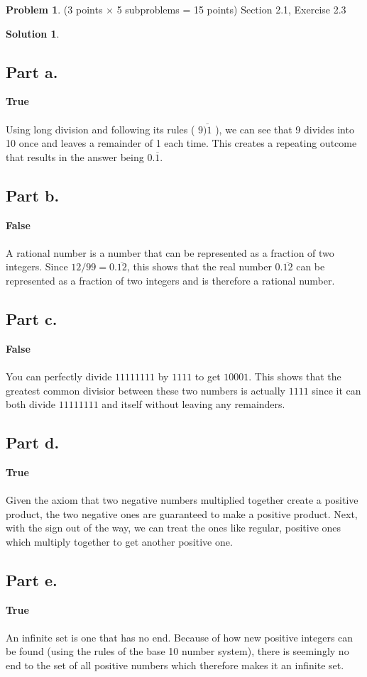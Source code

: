 \documentclass{article}
\theoremstyle{definition}
\newtheorem{problem}{Problem}
\newtheorem*{solution}{Solution}
\begin{document}
\newpage
\begin{problem} (3 points $\times$ 5 subproblems = 15 points) Section 2.1, Exercise 2.3
\end{problem}
\begin{solution}
\hspace{1cm}
\subsection*{Part a.}
\textbf{True}
\\
\\
Using long division and following its rules ( $9\overline{)1}$ ), we can see that 9 divides into 10 once and leaves a remainder of 1 each time. This creates a repeating outcome that results in the answer being $0.\overline{1}$.
\subsection*{Part b.}
\textbf{False}
\\
\\
A rational number is a number that can be represented as a fraction of two integers. Since $12/99 = 0.\overline{12}$, this shows that the real number $0.\overline{12}$ can be represented as a fraction of two integers and is therefore a rational number.
\subsection*{Part c.}
\textbf{False}
\\
\\
You can perfectly divide $11111111$ by $1111$ to get $10001$. This shows that the greatest common divisior between these two numbers is actually $1111$ since it can both divide $11111111$ and itself without leaving any remainders.
\subsection*{Part d.}
\textbf{True}
\\
\\
Given the axiom that two negative numbers multiplied together create a positive product, the two negative ones are guaranteed to make a positive product. Next, with the sign out of the way, we can treat the ones like regular, positive ones which multiply together to get another positive one.
\subsection*{Part e.}
\textbf{True}
\\
\\
An infinite set is one that has no end. Because of how new positive integers can be found (using the rules of the base 10 number system), there is seemingly no end to the set of all positive numbers which therefore makes it an infinite set.
\end{solution}
\end{document}
